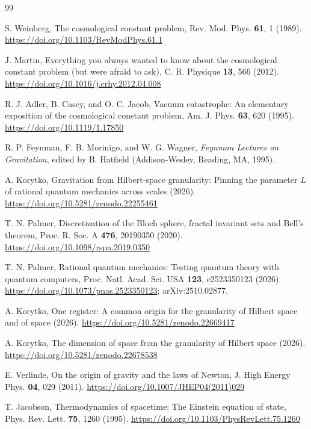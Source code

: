 \documentclass[aps,prd,twocolumn,superscriptaddress,nofootinbib,showkeys]{revtex4-2}
\begin{document}
\begin{thebibliography}{99}

 S. Weinberg, The cosmological constant problem, Rev. Mod. Phys. \textbf{61}, 1 (1989). \url{https://doi.org/10.1103/RevModPhys.61.1}

 J. Martin, Everything you always wanted to know about the cosmological constant problem (but were afraid to ask), C. R. Physique \textbf{13}, 566 (2012). \url{https://doi.org/10.1016/j.crhy.2012.04.008}

 R. J. Adler, B. Casey, and O. C. Jacob, Vacuum catastrophe: An elementary exposition of the cosmological constant problem, Am. J. Phys. \textbf{63}, 620 (1995). \url{https://doi.org/10.1119/1.17850}

 R. P. Feynman, F. B. Morinigo, and W. G. Wagner, \emph{Feynman Lectures on Gravitation}, edited by B. Hatfield (Addison-Wesley, Reading, MA, 1995).

 A. Korytko, Gravitation from Hilbert-space granularity: Pinning the parameter $L$ of rational quantum mechanics across scales (2026). \url{https://doi.org/10.5281/zenodo.22255461}

 T. N. Palmer, Discretization of the Bloch sphere, fractal invariant sets and Bell's theorem, Proc. R. Soc. A \textbf{476}, 20190350 (2020). \url{https://doi.org/10.1098/rspa.2019.0350}

 T. N. Palmer, Rational quantum mechanics: Testing quantum theory with quantum computers, Proc. Natl. Acad. Sci. USA \textbf{123}, e2523350123 (2026). \url{https://doi.org/10.1073/pnas.2523350123}; arXiv:2510.02877.

 A. Korytko, One register: A common origin for the granularity of Hilbert space and of space (2026). \url{https://doi.org/10.5281/zenodo.22669417}

 A. Korytko, The dimension of space from the granularity of Hilbert space (2026). \url{https://doi.org/10.5281/zenodo.22678538}

 E. Verlinde, On the origin of gravity and the laws of Newton, J. High Energy Phys. \textbf{04}, 029 (2011). \url{https://doi.org/10.1007/JHEP04(2011)029}

 T. Jacobson, Thermodynamics of spacetime: The Einstein equation of state, Phys. Rev. Lett. \textbf{75}, 1260 (1995). \url{https://doi.org/10.1103/PhysRevLett.75.1260}


\end{thebibliography}
\end{document}

